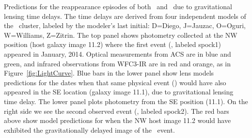 \label{fig:SpockDelayPredictions}
Predictions for the reappearance episodes of both \spockone\ and \spocktwo\, due to gravitational lensing time delays.  The time delays are derived from four independent models of the \ cluster, labeled by the modeler's last initial: D=Diego, J=Jauzac, O=Oguri, W=Williams, Z=Zitrin.  The top panel shows photometry collected at the NW position (host galaxy image 11.2) where the first event (\spockone, labeled spock1) appeared in January, 2014.  Optical measurements from ACS are in blue and green, and infrared observations from WFC3-IR are in red and orange, as in Figure~\ref{fig:LightCurve}.  Blue bars in the lower panel show lens models predictions for the dates when that same physical event (\spockone) would have also appeared in the SE location (galaxy image 11.1), due to gravitational lensing time delay.  The lower panel plots photometry from the SE position (11.1). On the right side we see the second observed event (\spocktwo, labeled spock2).  The red bars above show model predictions for when the NW host image 11.2 would have exhibited the gravitationally delayed image of the \spocktwo\ event.
  
  